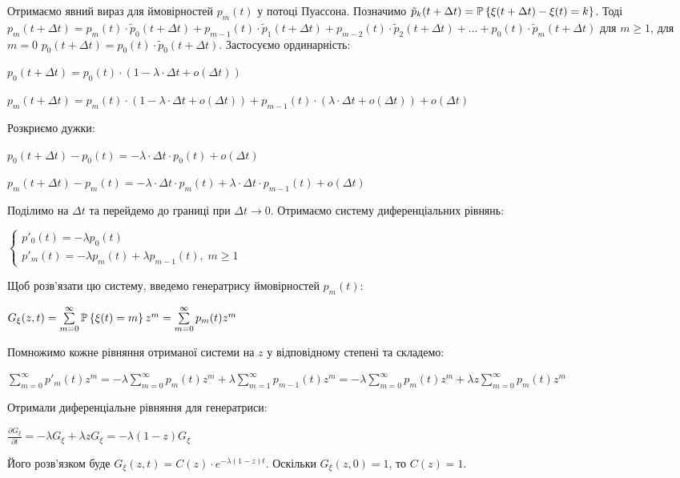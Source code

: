 Отримаємо явний вираз для ймовірностей $p_m(t)$ у потоці Пуассона.
Позначимо $\tilde{p}_k(t+\Delta t) = \P\left\{\xi(t+\Delta t) - \xi(t) = k\right\}$.
Тоді $p_m(t+\Delta t) = p_m(t)\cdot \tilde{p}_0(t+\Delta t) + p_{m-1}(t)\cdot \tilde{p}_1(t+\Delta t) +
p_{m-2}(t)\cdot \tilde{p}_2(t+\Delta t) + ... + p_0(t)\cdot \tilde{p}_m(t+\Delta t)$ для $m \geq 1$,
для $m=0$ $p_0(t+\Delta t) = p_0(t)\cdot\tilde{p}_0(t+\Delta t)$. Застосуємо ординарність:

$p_0(t+\Delta t) = p_0(t) \cdot (1 - \lambda \cdot \Delta t + o(\Delta t))$

$p_m(t+\Delta t) = p_m(t) \cdot (1 - \lambda \cdot \Delta t + o(\Delta t)) + p_{m-1}(t) \cdot (\lambda \cdot \Delta t + o(\Delta t)) + o(\Delta t)$

\noindent Розкриємо дужки:

$p_0(t+\Delta t) - p_0(t) = -\lambda \cdot \Delta t \cdot p_0(t) + o(\Delta t)$
\nopagebreak

$p_m(t+\Delta t) - p_m(t) = -\lambda \cdot \Delta t \cdot p_m(t) + \lambda\cdot\Delta t \cdot p_{m-1}(t) + o(\Delta t)$

\noindent Поділимо на $\Delta t$ та перейдемо до границі при $\Delta t \rightarrow 0$.
Отримаємо систему диференціальних рівнянь:

$\begin{cases}
    p'_0(t) = - \lambda p_0(t) \\
    p'_m(t) = - \lambda p_m(t) + \lambda p_{m-1}(t), \; m \geq 1
\end{cases}$

\noindent Щоб розв'язати цю систему, введемо генератрису ймовірностей $p_m(t)$:

$G_\xi(z, t) = \sum\limits_{m=0}^{\infty} \P\left\{\xi(t) = m\right\} z^m = \sum\limits_{m=0}^{\infty} p_m(t) z^m$ 

\noindent Помножимо кожне рівняння отриманої системи на $z$ у відповідному степені та складемо:

$\sum\limits_{m=0}^{\infty} p'_m(t) z^m = -\lambda \sum\limits_{m=0}^{\infty} p_m(t) z^m + \lambda \sum\limits_{m=1}^{\infty} p_{m-1}(t) z^m = 
-\lambda \sum\limits_{m=0}^{\infty} p_m(t) z^m + \lambda z \sum\limits_{m=0}^{\infty} p_{m}(t) z^m$

\noindent Отримали диференціальне рівняння для генератриси:

$\frac{\partial G_\xi}{\partial t} = - \lambda G_\xi + \lambda z G_\xi = -\lambda(1-z) G_\xi$

\noindent Його розв'язком буде $G_\xi(z, t) = C(z) \cdot e^{-\lambda(1-z)t}$.
Оскільки $G_\xi(z, 0) = 1$, то $C(z) = 1$.

